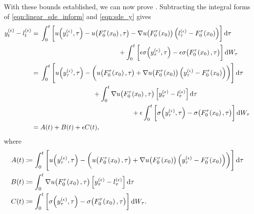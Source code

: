 With these bounds established, we can now prove .
Subtracting the integral forms of \cref{eqn:linear_sde_inform} and \cref{eqn:sde_y} gives
\begin{align*}
	y_t^{(\epsilon)} - l_t^{(\epsilon)} & = \begin{multlined}[t]
		                                        \int_0^t{\left[u\!\left(y_\tau^{(\epsilon)}, \tau\right) - u\!\left(F_0^\tau\!\left(x_0\right), \tau\right) - \nabla u\!\left(F_0^\tau\!\left(x_0\right)\right)\left(l_\tau^{(\epsilon)} - F_0^\tau\!\left(x_0\right)\right)\right]\dif\tau} \\
		                                        + \int_0^t{\left[\epsilon\sigma\!\left(y_\tau^{(\epsilon)}, \tau\right) - \epsilon\sigma\!\left(F_0^{\tau}\!\left(x_0\right), \tau\right)\right]\dif W_\tau}
	                                        \end{multlined}              \\
	                                    & = \begin{multlined}[t]
		                                        \int_0^t{\left[u\!\left(y_\tau^{(\epsilon)}, \tau\right) - \left(u\!\left(F_0^\tau\!\left(x_0\right), \tau\right) + \nabla u\!\left(F_0^\tau\!\left(x_0\right)\right)\left(y_\tau^{(\epsilon)} - F_0^\tau\!\left(x_0\right)\right)\right)\right]\dif\tau} \\
		                                        + \int_0^t{\nabla u\!\left(F_0^\tau\!\left(x_0\right), \tau\right)\left[y_\tau^{(\epsilon)} - l_\tau^{(\epsilon)}\right]\dif \tau} \\
		                                        + \epsilon\int_0^t{ \left[\sigma\!\left(y_\tau^{(\epsilon)}, \tau\right) - \sigma\!\left(F_0^{\tau}\!\left(x_0\right), \tau\right)\right]\dif W_\tau}
	                                        \end{multlined} \\
	                                    & = A(t) + B(t) + \epsilon C(t),
\end{align*}
where
\begin{align*}
	A(t) & \coloneqq \int_0^t{\left[u\!\left(y_\tau^{(\epsilon)}, \tau\right) - \left(u\!\left(F_0^\tau\!\left(x_0\right), \tau\right) + \nabla u\!\left(F_0^\tau\!\left(x_0\right)\right)\left(y_\tau^{(\epsilon)} - F_0^\tau\!\left(x_0\right)\right)\right)\right]\dif\tau} \\
	B(t) & \coloneqq \int_0^t{\nabla u\!\left(F_0^\tau\!\left(x_0\right), \tau\right)\left[y_\tau^{(\epsilon)} - l_\tau^{(\epsilon)}\right]\dif \tau}                                                                                                                          \\
	C(t) & \coloneqq \int_0^t{\left[\sigma\!\left(y_\tau^{(\epsilon)}, \tau\right) - \sigma\!\left(F_0^{\tau}\!\left(x_0\right), \tau\right)\right]\dif W_\tau}.
\end{align*}
